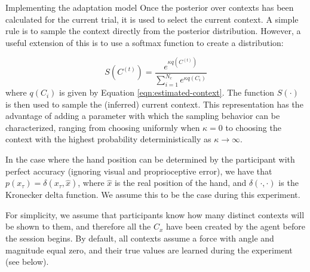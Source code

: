 \documentclass{report}
\def \eref #1{Equation \ref{#1}}   %
\begin{document}
\begin{chapter}{Implementing the adaptation model}
Once the posterior over contexts has been calculated for the current trial, it
is used to select the current context. A simple rule is to sample the context
directly from the posterior distribution. However, a useful extension of this
is to use a softmax function to create a distribution:

\begin{equation}
S(C^{(t)}) = \frac{e^{\kappa
q\left(C^{(t)}\right)}}{\displaystyle \sum_{i=1}^{N_c}e^{\kappa
q\left(C_i\right)}}
\end{equation}
where $q(C_i)$ is given by \eref{eqn:estimated-context}. The
function $S(\cdot)$ is then used to sample the (inferred) current context. This
representation has the advantage of adding a parameter with which the sampling
behavior can be characterized, ranging from choosing uniformly when $\kappa =
0$ to choosing the context with the highest probability deterministically as
$\kappa \rightarrow \infty$.

In the case where the hand position can be determined by the participant with
perfect accuracy (ignoring visual and proprioceptive error), we have that
$p(x_\tau) = \delta(x_\tau, \hat x)$, where $\hat x$ is the real position of
the hand, and $\delta (\cdot, \cdot)$ is the Kronecker delta function. We
assume this to be the case during this experiment.

For simplicity, we assume that participants know how many distinct contexts
will be shown to them, and therefore all the $C_x$ have been created by the
agent before the session begins. By default, all contexts assume a force with
angle and magnitude equal zero, and their true values are learned during the
experiment (see below).


\end{chapter}
\end{document}
